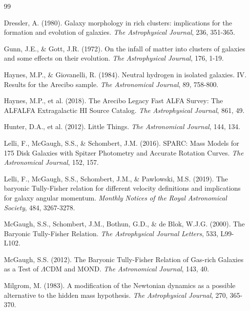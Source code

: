 \documentclass[12pt,a4paper]{article}
\begin{document}
\begin{thebibliography}{99}

Dressler, A. (1980). Galaxy morphology in rich clusters: implications for the formation and evolution of galaxies. \textit{The Astrophysical Journal}, 236, 351-365.

Gunn, J.E., \& Gott, J.R. (1972). On the infall of matter into clusters of galaxies and some effects on their evolution. \textit{The Astrophysical Journal}, 176, 1-19.

Haynes, M.P., \& Giovanelli, R. (1984). Neutral hydrogen in isolated galaxies. IV. Results for the Arecibo sample. \textit{The Astronomical Journal}, 89, 758-800.

Haynes, M.P., et al. (2018). The Arecibo Legacy Fast ALFA Survey: The ALFALFA Extragalactic HI Source Catalog. \textit{The Astrophysical Journal}, 861, 49.

Hunter, D.A., et al. (2012). Little Things. \textit{The Astronomical Journal}, 144, 134.

Lelli, F., McGaugh, S.S., \& Schombert, J.M. (2016). SPARC: Mass Models for 175 Disk Galaxies with Spitzer Photometry and Accurate Rotation Curves. \textit{The Astronomical Journal}, 152, 157.

Lelli, F., McGaugh, S.S., Schombert, J.M., \& Pawlowski, M.S. (2019). The baryonic Tully-Fisher relation for different velocity definitions and implications for galaxy angular momentum. \textit{Monthly Notices of the Royal Astronomical Society}, 484, 3267-3278.

McGaugh, S.S., Schombert, J.M., Bothun, G.D., \& de Blok, W.J.G. (2000). The Baryonic Tully-Fisher Relation. \textit{The Astrophysical Journal Letters}, 533, L99-L102.

McGaugh, S.S. (2012). The Baryonic Tully-Fisher Relation of Gas-rich Galaxies as a Test of $\Lambda$CDM and MOND. \textit{The Astronomical Journal}, 143, 40.

Milgrom, M. (1983). A modification of the Newtonian dynamics as a possible alternative to the hidden mass hypothesis. \textit{The Astrophysical Journal}, 270, 365-370.


\end{thebibliography}
\end{document}
